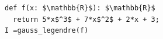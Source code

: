 \documentclass[border=10pt]{standalone}
\begin{document}
\begin{lstlisting}
def f(x: $\mathbb{R}$): $\mathbb{R}$ 
  return 5*x$^3$ + 7*x$^2$ + 2*x + 3;
I =gauss_legendre(f)
\end{lstlisting}
\end{document}
